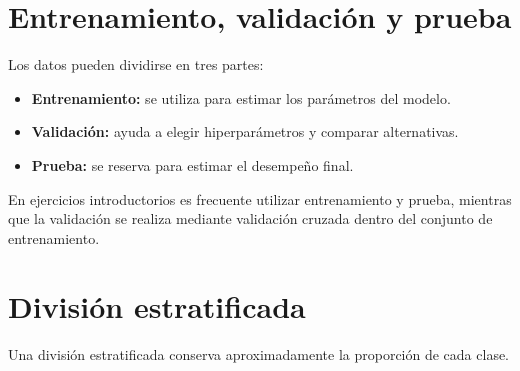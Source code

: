 \documentclass[
  spanish,
  10.5pt,
  letterpaper,
  openany,
  headings=big]{scrbook}
\newenvironment{Shaded}{}{}
\newcommand{\AttributeTok}[1]{\textcolor[rgb]{0.84,0.23,0.29}{#1}}
\newcommand{\ControlFlowTok}[1]{\textcolor[rgb]{0.84,0.23,0.29}{#1}}
\newcommand{\DecValTok}[1]{\textcolor[rgb]{0.00,0.36,0.77}{#1}}
\newcommand{\FloatTok}[1]{\textcolor[rgb]{0.00,0.36,0.77}{#1}}
\newcommand{\FunctionTok}[1]{\textcolor[rgb]{0.44,0.26,0.76}{#1}}
\newcommand{\NormalTok}[1]{\textcolor[rgb]{0.14,0.16,0.18}{#1}}
\newcommand{\OtherTok}[1]{\textcolor[rgb]{0.44,0.26,0.76}{#1}}
\newcommand{\SpecialCharTok}[1]{\textcolor[rgb]{0.00,0.36,0.77}{#1}}
\providecommand{\tightlist}{%
  \setlength{\itemsep}{0pt}\setlength{\parskip}{0pt}}
\begin{document}
\section{Entrenamiento, validación y
prueba}\label{entrenamiento-validaciuxf3n-y-prueba}

Los datos pueden dividirse en tres partes:

\begin{itemize}
\tightlist
\item
  \textbf{Entrenamiento:} se utiliza para estimar los parámetros del
  modelo.
\item
  \textbf{Validación:} ayuda a elegir hiperparámetros y comparar
  alternativas.
\item
  \textbf{Prueba:} se reserva para estimar el desempeño final.
\end{itemize}

En ejercicios introductorios es frecuente utilizar entrenamiento y
prueba, mientras que la validación se realiza mediante validación
cruzada dentro del conjunto de entrenamiento.

\section{División estratificada}\label{divisiuxf3n-estratificada}

Una división estratificada conserva aproximadamente la proporción de
cada clase.

\begin{Shaded}
\end{Shaded}
\end{document}
